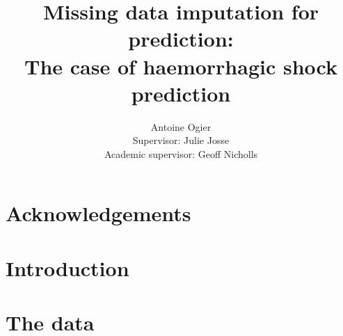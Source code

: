 \documentclass[12pt, a4paper]{article}
\title{Missing data imputation for prediction: \\ The case of haemorrhagic shock prediction}
\author{Antoine Ogier \\ Supervisor: Julie Josse \\ Academic supervisor: Geoff Nicholls}
\begin{document}
\maketitle
\thispagestyle{empty}
\tableofcontents
\newpage
{}

\section*{Acknowledgements}
\section*{Introduction}
\section{The data}
\end{document}
